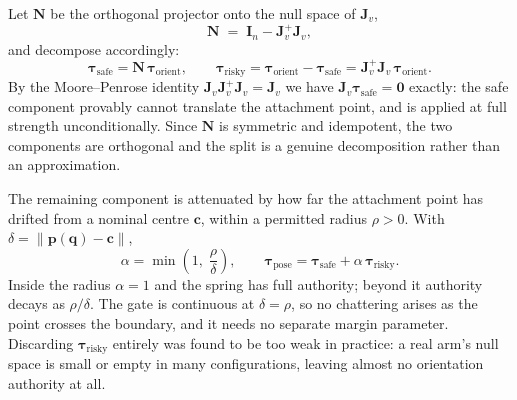 Let $\bm{N}$ be the orthogonal projector onto the null space of $\bm{J}_{v}$,
%
\begin{equation}
  \bm{N} \;=\; \bm{I}_{n} - \bm{J}_{v}^{+}\bm{J}_{v},
\end{equation}
%
and decompose accordingly:
%
\begin{equation}
  \bm{\tau}_{\mathrm{safe}} = \bm{N}\,\bm{\tau}_{\mathrm{orient}},
  \qquad
  \bm{\tau}_{\mathrm{risky}} = \bm{\tau}_{\mathrm{orient}}
                             - \bm{\tau}_{\mathrm{safe}}
                             = \bm{J}_{v}^{+}\bm{J}_{v}\,
                               \bm{\tau}_{\mathrm{orient}}.
  \label{eq:pose-split}
\end{equation}
%
By the Moore--Penrose identity $\bm{J}_{v}\bm{J}_{v}^{+}\bm{J}_{v} =
\bm{J}_{v}$ we have $\bm{J}_{v}\bm{\tau}_{\mathrm{safe}} = \bm{0}$ exactly:
the safe component provably cannot translate the attachment point, and is
applied at full strength unconditionally. Since $\bm{N}$ is symmetric and
idempotent, the two components are orthogonal and the split is a genuine
decomposition rather than an approximation.

The remaining component is attenuated by how far the attachment point has
drifted from a nominal centre $\bm{c}$, within a permitted radius $\rho > 0$.
With $\delta = \lVert\bm{p}(\bm{q}) - \bm{c}\rVert$,
%
\begin{equation}
  \alpha = \min\!\left(1,\; \frac{\rho}{\delta}\right),
  \qquad
  \bm{\tau}_{\mathrm{pose}} = \bm{\tau}_{\mathrm{safe}}
                            + \alpha\,\bm{\tau}_{\mathrm{risky}}.
  \label{eq:pose-gate}
\end{equation}
%
Inside the radius $\alpha = 1$ and the spring has full authority; beyond it
authority decays as $\rho/\delta$. The gate is continuous at $\delta = \rho$,
so no chattering arises as the point crosses the boundary, and it needs no
separate margin parameter. Discarding $\bm{\tau}_{\mathrm{risky}}$ entirely
was found to be too weak in practice: a real arm's null space is small or
empty in many configurations, leaving almost no orientation authority at all.

